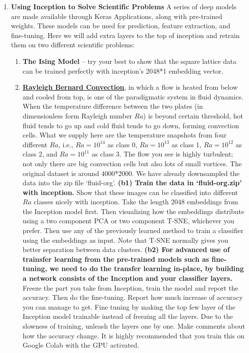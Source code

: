 \documentclass[12pt]{amsart}
\begin{document}
\begin{enumerate}
\begin{enumerate}
\end{enumerate}
\vskip 0.7cm
\item{\bf Using Inception to Solve Scientific Problems}  A series of deep models are made available through Keras Applications, along with pre-trained weights. These models can be used for prediction, feature extraction, and fine-tuning. Here we will add extra layers to the top of inception and retrain them on two different scientific problems:
\begin{enumerate}
\vskip 0.7cm
\item \textbf{The Ising Model} -- try your best to show that the square lattice data can be trained perfectly with inception's 2048*1 embedding vector. 
\vskip 0.7cm
\item \textbf{\href{https://en.wikipedia.org/wiki/Rayleigh\%E2\%80\%93B\%C3\%A9nard_convection}{Rayleigh Bernard Convection}},  in which a flow is heated from below and cooled  from top, is one of the paradigmatic system in fluid dynamics. When the temperature difference between the two plates (in dimensionless form Rayleigh number $Ra$) is beyond certain threshold, hot fluid tends to go up and cold fluid tends to go down, forming convection cells. What we supply here are the temperature snapshots from four different $Ra$, i.e., $Ra= 10^{14}$ as class 0, $Ra= 10^{13}$ as class 1, $Ra= 10^{12}$ as class 2, and $Ra= 10^{11}$ as class 3. The flow you see is highly turbulent; not only there are big convection cells but also lots of small vortices.  The original dataset is around 4000*2000. We have already downsampled the data into the zip file `fluid-org'.
\vskip 0.7cm
\textbf{(b1) Train the data in `fluid-org.zip' with inception.} Show that these images can be classified into different $Ra$ classes nicely  with  inception. Take the length 2048 embeddings from the Inception model first. Then visualizing how the embeddings distribute using a two component PCA or two component T-SNE, whichever you prefer. Then use any of the previously learned method to train a classifier using the embeddings as input. Note that T-SNE normally gives you better separation between data clusters.
\vskip 0.7cm
\textbf{(b2) For advanced use of trainsfer learning from the pre-trained models such as fine-tuning, we need to do the transfer learning in-place, by building a network consists of the Inception and your classifier layers.} Freeze the part you take from Inception, train the model and report the accuracy. Then do the fine-tuning. Report how much increase of accuracy you can manage to get.
Fine tuning by making the top few layer of the Inception model trainable instead of freezing all the layers. Due to the slowness of training, unleash the layers one by one. Make comments about how the accuracy change. It is highly recommended that you train this on Google Colab with the GPU activated.

\end{enumerate}
\end{enumerate}
\end{document}

